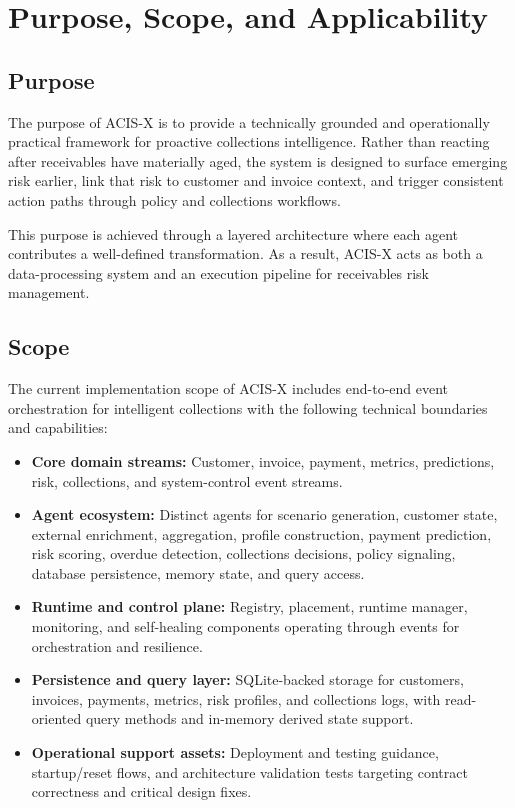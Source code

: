 \documentclass[a4paper, 12pt]{report}
\begin{document}
\section{Purpose, Scope, and Applicability}

\subsection{Purpose}
The purpose of ACIS-X is to provide a technically grounded and operationally practical framework for proactive collections intelligence. Rather than reacting after receivables have materially aged, the system is designed to surface emerging risk earlier, link that risk to customer and invoice context, and trigger consistent action paths through policy and collections workflows.

This purpose is achieved through a layered architecture where each agent contributes a well-defined transformation. As a result, ACIS-X acts as both a data-processing system and an execution pipeline for receivables risk management.

\subsection{Scope}
The current implementation scope of ACIS-X includes end-to-end event orchestration for intelligent collections with the following technical boundaries and capabilities:

\begin{itemize}[itemsep=2pt]
    \item \textbf{Core domain streams:}
    Customer, invoice, payment, metrics, predictions, risk, collections, and system-control event streams.
    
    \item \textbf{Agent ecosystem:}
    Distinct agents for scenario generation, customer state, external enrichment, aggregation, profile construction, payment prediction, risk scoring, overdue detection, collections decisions, policy signaling, database persistence, memory state, and query access.
    
    \item \textbf{Runtime and control plane:}
    Registry, placement, runtime manager, monitoring, and self-healing components operating through events for orchestration and resilience.
    
    \item \textbf{Persistence and query layer:}
    SQLite-backed storage for customers, invoices, payments, metrics, risk profiles, and collections logs, with read-oriented query methods and in-memory derived state support.
    
    \item \textbf{Operational support assets:}
    Deployment and testing guidance, startup/reset flows, and architecture validation tests targeting contract correctness and critical design fixes.
\end{itemize}
\end{document}
